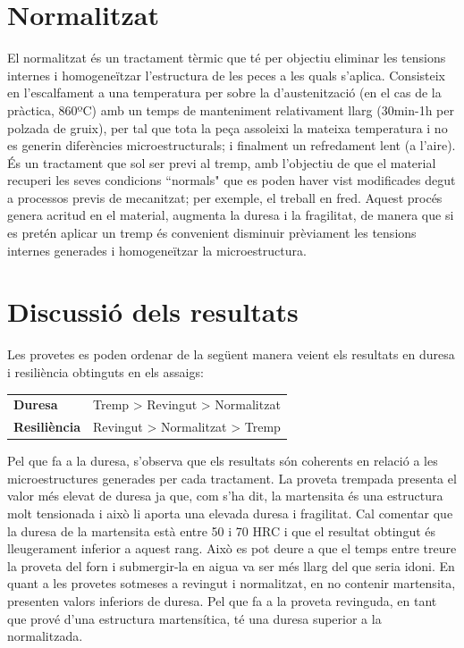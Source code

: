 \documentclass[a4paper]{report}
\begin{document}
\section{Normalitzat}
El normalitzat és un tractament tèrmic que té per objectiu eliminar les tensions internes i homogeneïtzar l’estructura de les peces a les quals s’aplica. Consisteix en l’escalfament a una temperatura per sobre la d’austenització (en el cas de la pràctica, 860ºC) amb un temps de manteniment relativament llarg (30min-1h per polzada de gruix),  per tal que tota la peça assoleixi la mateixa temperatura i no es generin diferències microestructurals; i finalment un refredament lent (a l’aire). És un tractament que sol ser previ al tremp, amb l’objectiu de que el material recuperi les seves condicions ``normals" que es poden haver vist modificades degut a processos previs de mecanitzat; per exemple, el treball en fred. Aquest procés genera acritud en el material, augmenta la duresa i la fragilitat, de manera que si es pretén aplicar un tremp és convenient disminuir prèviament les tensions internes generades i homogeneïtzar la microestructura. 

\section{Discussió dels resultats}
Les provetes es poden ordenar de la següent manera veient els resultats en duresa i resiliència obtinguts en els assaigs:

\begin{table}[H]
	\centering
	\begin{tabular}{lr}
		\textbf{Duresa} & Tremp > Revingut > Normalitzat \\
		\textbf{Resiliència} & Revingut > Normalitzat > Tremp
	\end{tabular}
\end{table}

Pel que fa a la duresa, s’observa que els resultats són coherents en relació a les microestructures generades per cada tractament. La proveta trempada presenta el valor més elevat de duresa ja que, com s’ha dit, la martensita és una estructura molt tensionada i això li aporta una elevada duresa i fragilitat. Cal comentar que la duresa de la martensita està entre 50 i 70 HRC i que el resultat obtingut és lleugerament inferior a aquest rang. Això es pot deure a que el temps entre treure la proveta del forn i submergir-la en aigua va ser més llarg del que seria idoni. En quant a les provetes sotmeses a revingut i normalitzat, en no contenir martensita, presenten valors inferiors de duresa. Pel que fa a la proveta revinguda, en tant que prové d’una estructura martensítica, té una duresa superior a la normalitzada.
\end{document}
